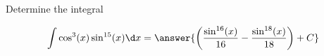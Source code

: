 \documentclass{ximera}
\author{Jason Miller}
\begin{document}
\begin{exercise}
Determine the integral

\[
\int \cos^{3}(x)\sin^{15}(x) \d x= \answer{ \left( \frac{ \sin^{16}(x)}{16} - \frac{ \sin^{18}(x) }{18} \right) +C }
\]


\end{exercise}
\end{document}

